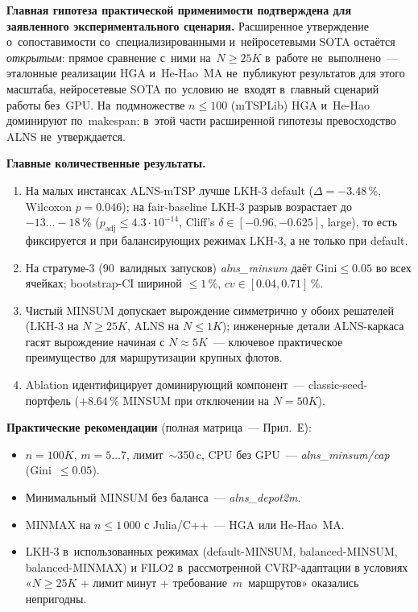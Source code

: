 \documentclass[a4paper,14pt]{extreport}
\begin{document}
\textbf{Главная гипотеза практической применимости подтверждена для заявленного экспериментального сценария.} Расширенное утверждение о~сопоставимости со~специализированными и~нейросетевыми SOTA остаётся \emph{открытым}: прямое сравнение с~ними на~$N\geq 25K$ в~работе не~выполнено~--- эталонные реализации HGA и~He-Hao~MA не~публикуют результатов для этого масштаба, нейросетевые SOTA по~условию не~входят в~главный сценарий работы без~GPU. На~подмножестве $n\leq 100$ (mTSPLib) HGA и~He-Hao доминируют по~makespan; в~этой части расширенной гипотезы превосходство ALNS не~утверждается.

\medskip
\textbf{Главные количественные результаты.}
\begin{enumerate}
\item На малых инстансах ALNS-mTSP лучше LKH-3 default ($\Delta=-3.48\,\%$, Wilcoxon $p=0.046$); на fair-baseline LKH-3 разрыв возрастает до $-13\dots-18\,\%$ ($p_\mathrm{adj}\leq 4.3{\cdot}10^{-14}$, Cliff's $\delta\in[-0.96,-0.625]$, large), то есть фиксируется и при балансирующих режимах LKH-3, а не только при default.
\item На стратуме-3 (90~валидных запусков) \emph{alns\_minsum} даёт $\mathrm{Gini}\leq 0.05$ во всех ячейках; bootstrap-CI шириной $\leq 1\,\%$, $cv\in[0.04,0.71]\,\%$.
\item Чистый MINSUM допускает вырождение симметрично у обоих решателей (LKH-3 на $N\geq 25K$, ALNS на $N\leq 1K$); инженерные детали ALNS-каркаса гасят вырождение начиная с $N\approx 5K$~--- ключевое практическое преимущество для маршрутизации крупных флотов.
\item Ablation идентифицирует доминирующий компонент~--- classic-seed-портфель ($+8.64\,\%$ MINSUM при отключении на $N=50K$).
\end{enumerate}

\medskip
\textbf{Практические рекомендации} (полная матрица~--- Прил.~Е):
\begin{itemize}
\item $n=100K$, $m=5\dots 7$, лимит~$\sim$350\,c, CPU без GPU~--- \emph{alns\_minsum/cap} (Gini~$\leq 0.05$).
\item Минимальный MINSUM без баланса~--- \emph{alns\_depot2m}.
\item MINMAX на $n\leq 1\,000$ с Julia/C++~--- HGA или He-Hao~MA.
\item LKH-3 в~использованных режимах (default-MINSUM, balanced-MINSUM, balanced-MINMAX) и FILO2 в~рассмотренной CVRP-адаптации в условиях «$N\geq 25K$ + лимит минут + требование~$m$~маршрутов» оказались непригодны.
\end{itemize}
\end{document}
